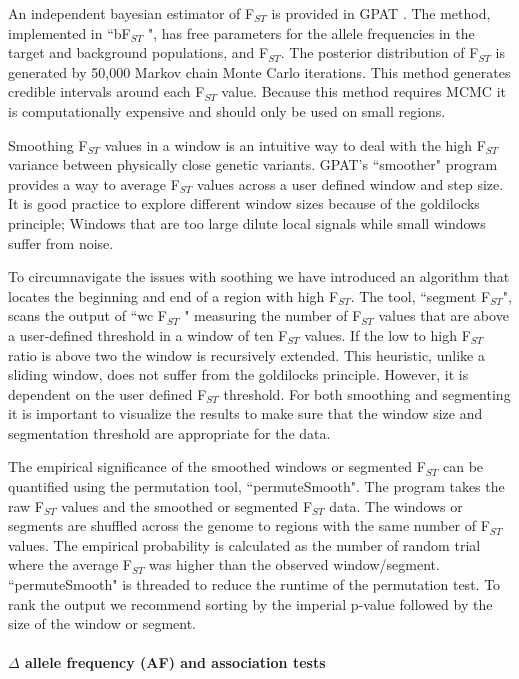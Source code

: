 \documentclass[10pt,letterpaper]{article}
\begin{document}
An independent bayesian estimator of F$_{ST}$ is provided in GPAT \cite{bfst}.  The method, implemented in ``bF$_{ST}$ ", has free parameters for the allele frequencies in the target and background populations, and F$_{ST}$.  The posterior distribution of F$_{ST}$ is generated by 50,000 Markov chain Monte Carlo iterations.  This method generates credible intervals around each F$_{ST}$ value.  Because this method requires MCMC it is computationally expensive and should only be used on small regions.

Smoothing F$_{ST}$  values in a window is an intuitive way to deal with the high F$_{ST}$ variance between physically close genetic variants.  GPAT's ``smoother" program provides a way to average  F$_{ST}$  values across a user defined window and step size.  It is good practice to explore different window sizes because of the goldilocks principle; Windows that are too large dilute local signals while small windows suffer from noise.

To circumnavigate the issues with soothing we have introduced an algorithm that locates the beginning and end of a region with high  F$_{ST}$.  The tool, ``segment F$_{ST}$", scans the output of ``wc F$_{ST}$ " measuring the number of  F$_{ST}$  values that are above a user-defined threshold in a window of ten F$_{ST}$ values.  If the low to high  F$_{ST}$  ratio is above two the window is recursively extended.  This heuristic, unlike a sliding window, does not suffer from the goldilocks principle.  However, it is dependent on the user defined F$_{ST}$ threshold.  For both smoothing and segmenting it is important to visualize the results to make sure that the window size and segmentation threshold are appropriate for the data.

The empirical significance of the smoothed windows or segmented  F$_{ST}$ can be quantified using the permutation tool, ``permuteSmooth".  The program takes the raw F$_{ST}$ values and the smoothed or segmented F$_{ST}$  data.  The windows or segments are shuffled across the genome to regions with the same number of  F$_{ST}$  values.  The empirical probability is calculated as the number of random trial where the average  F$_{ST}$  was higher than the observed window/segment.  ``permuteSmooth" is threaded to reduce the runtime of the permutation test.  To rank the output we recommend sorting by the imperial p-value followed by the size of the window or segment.

\paragraph*{$\Delta$ allele frequency (AF) and association tests} \mbox{} \\
\end{document}
